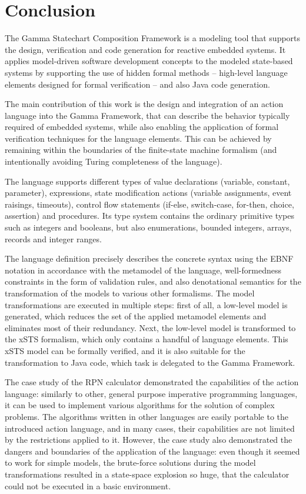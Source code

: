 \chapter{Conclusion} \label{chapter_conclusion}
The Gamma Statechart Composition Framework is a modeling tool that supports the design, verification and code generation for reactive embedded systems. It applies model-driven software development concepts to the modeled state-based systems by supporting the use of hidden formal methods -- high-level language elements designed for formal verification -- and also Java code generation.

The main contribution of this work is the design and integration of an action language into the Gamma Framework, that can describe the behavior typically required of embedded systems, while also enabling the application of formal verification techniques for the language elements. This can be achieved by remaining within the boundaries of the finite-state machine formalism (and intentionally avoiding Turing completeness of the language).

The language supports different types of value declarations (variable, constant, parameter), expressions, state modification actions (variable assignments, event raisings, timeouts), control flow statements (if-else, switch-case, for-then, choice, assertion) and procedures. Its type system contains the ordinary primitive types such as integers and booleans, but also enumerations, bounded integers, arrays, records and integer ranges. 

The language definition precisely describes the concrete syntax using the EBNF notation in accordance with the metamodel of the language, well-formedness constraints in the form of validation rules, and also denotational semantics for the transformation of the models to various other formalisms. The model transformations are executed in multiple steps: first of all, a low-level model is generated, which reduces the set of the applied metamodel elements and eliminates most of their redundancy. Next, the low-level model is transformed to the xSTS formalism, which only contains a handful of language elements. This xSTS model can be formally verified, and it is also suitable for the transformation to Java code, which task is delegated to the Gamma Framework.

The case study of the RPN calculator demonstrated the capabilities of the action language: similarly to other, general purpose imperative programming languages, it can be used to implement various algorithms for the solution of complex problems. The algorithms written in other languages are easily portable to the introduced action language, and in many cases, their capabilities are not limited by the restrictions applied to it. However, the case study also demonstrated the dangers and boundaries of the application of the language: even though it seemed to work for simple models, the brute-force solutions during the model transformations resulted in a state-space explosion so huge, that the calculator could not be executed in a basic environment. 

